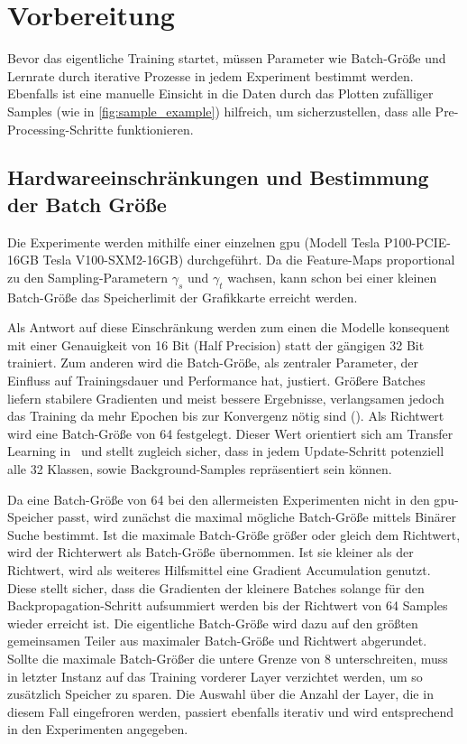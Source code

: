 \section{Vorbereitung}
\label{sec:vorbereitung}

Bevor das eigentliche Training startet, müssen Parameter wie Batch-Größe und Lernrate durch iterative Prozesse in jedem Experiment bestimmt werden.
Ebenfalls ist eine manuelle Einsicht in die Daten durch das Plotten zufälliger Samples (wie in \autoref{fig:sample_example}) hilfreich, um sicherzustellen, dass alle Pre-Processing-Schritte funktionieren.

\subsection{Hardwareeinschränkungen und Bestimmung der Batch Größe}
\label{subsec:hardwareeinschrankungen}

Die Experimente werden mithilfe einer einzelnen \gls{gpu} (Modell Tesla P100-PCIE-16GB \bzw Tesla V100-SXM2-16GB) durchgeführt.
Da die Feature-Maps proportional zu den Sampling-Parametern $\gamma_s$ und $\gamma_t$ wachsen, kann schon bei einer kleinen Batch-Größe das Speicherlimit der Grafikkarte erreicht werden.

Als Antwort auf diese Einschränkung werden zum einen die Modelle konsequent mit einer Genauigkeit von 16 Bit (Half Precision) statt der gängigen 32 Bit trainiert.
Zum anderen wird die Batch-Größe, als zentraler Parameter, der Einfluss auf Trainingsdauer und Performance hat, justiert.
Größere Batches liefern stabilere Gradienten und meist bessere Ergebnisse, verlangsamen jedoch das Training da mehr Epochen bis zur Konvergenz nötig sind (\cite{Gugger20}).
Als Richtwert wird eine Batch-Größe von 64 festgelegt.
Dieser Wert orientiert sich am Transfer Learning in~\cite{Feichtenhofer18} und stellt zugleich sicher, dass in jedem Update-Schritt potenziell alle 32 Klassen, sowie Background-Samples repräsentiert sein können.

Da eine Batch-Größe von 64 bei den allermeisten Experimenten nicht in den \gls{gpu}-Speicher passt, wird zunächst die maximal mögliche Batch-Größe mittels Binärer Suche bestimmt.
Ist die maximale Batch-Größe größer oder gleich dem Richtwert, wird der Richterwert als Batch-Größe übernommen.
Ist sie kleiner als der Richtwert, wird als weiteres Hilfsmittel eine Gradient Accumulation genutzt.
Diese stellt sicher, dass die Gradienten der kleinere Batches solange für den Backpropagation-Schritt aufsummiert werden bis der Richtwert von 64 Samples wieder erreicht ist.
Die eigentliche Batch-Größe wird dazu auf den größten gemeinsamen Teiler aus maximaler Batch-Größe und Richtwert abgerundet.
Sollte die maximale Batch-Größer die untere Grenze von 8 unterschreiten, muss in letzter Instanz auf das Training vorderer Layer verzichtet werden, um so zusätzlich Speicher zu sparen.
Die Auswahl über die Anzahl der Layer, die in diesem Fall eingefroren werden, passiert ebenfalls iterativ und wird entsprechend in den Experimenten angegeben.


